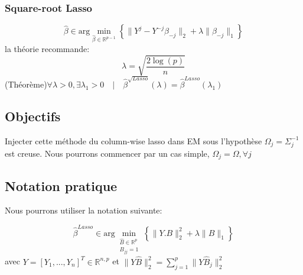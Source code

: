 \documentclass[12pt]{article}
\let\bb\mathbb       %
\def\RR{{\bb R}}\def\ZZ{{\bb Z}}\def\FF{{\bb F}}\def\DD{{\bb D}}
\def\bb{\mathbb}
\def\hat{\widehat}
\begin{document}
\subsubsection{Square-root Lasso}
 $$
\hat\beta \in \text{arg}\min_{\hat\beta\in\RR^{p-1}}
\left\{\parallel Y^j-Y^{-j}\beta_{-j}\parallel_2+\lambda\parallel\beta_{-j}\parallel_1 \right\}
$$
la théorie recommande:
$$
\lambda=\sqrt{ \frac{2\log(p)}{n}}
$$
(Théorème)\qquad$\forall\lambda>0, \exists\lambda_1>0\quad|\quad\hat\beta^{\sqrt{Lasso}}(\lambda)=\hat\beta^{Lasso}(\lambda_1)$

\subsection{Objectifs}

Injecter cette méthode du column-wise lasso dans EM sous l’hypothèse $\Omega_j=\Sigma_j^{-1}$ est creuse. Nous pourrons commencer par un cas simple, $\Omega_j=\Omega,\forall j$

\subsection{Notation pratique}

Nous pourrons utiliser la notation suivante:

 $$
\hat\beta^{Lasso} \in \text{arg}\min_{\substack{\hat B\in\RR^{p}\\B_{jj}=1}}
\left\{\parallel Y.B \parallel_2^2+\lambda \parallel B \parallel_1 \right\}
$$
avec $Y=[Y_1,...,Y_n]^T\in\RR^{n,p}$ et $\parallel Y\hat B\parallel_2^2=\sum_{j=1}^p\parallel Y\hat B_j\parallel_2^2$
\end{document}
